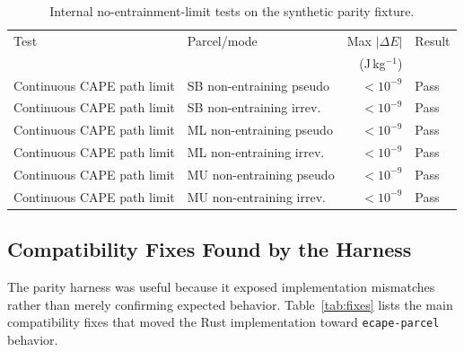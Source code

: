 \documentclass[11pt]{article}
\begin{document}
\begin{table}[H]
\centering
\caption{Internal no-entrainment-limit tests on the synthetic parity fixture.}
\label{tab:noentrainment}
\begin{tabular}{llrl}
\toprule
Test & Parcel/mode & Max $|\Delta E|$ & Result \\
 & & (J\,kg$^{-1}$) & \\
\midrule
Continuous CAPE path limit & SB non-entraining pseudo & $<10^{-9}$ & Pass \\
Continuous CAPE path limit & SB non-entraining irrev. & $<10^{-9}$ & Pass \\
Continuous CAPE path limit & ML non-entraining pseudo & $<10^{-9}$ & Pass \\
Continuous CAPE path limit & ML non-entraining irrev. & $<10^{-9}$ & Pass \\
Continuous CAPE path limit & MU non-entraining pseudo & $<10^{-9}$ & Pass \\
Continuous CAPE path limit & MU non-entraining irrev. & $<10^{-9}$ & Pass \\
\bottomrule
\end{tabular}
\end{table}

\subsection{Compatibility Fixes Found by the Harness}

The parity harness was useful because it exposed implementation mismatches rather than merely confirming expected behavior. Table~\ref{tab:fixes} lists the main compatibility fixes that moved the Rust implementation toward \texttt{ecape-parcel} behavior.
\end{document}

